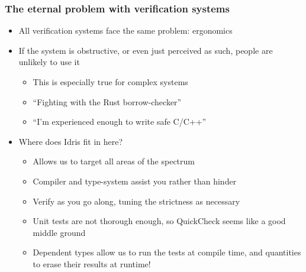 \documentclass[compress,handout]{beamer}
\begin{document}
\begin{frame}
  \frametitle{The eternal problem with verification systems}

  \begin{itemize}
    \item<1-> All verification systems face the same problem: ergonomics
    \item<2-> If the system is obstructive, or even just perceived as such,
              people are unlikely to use it
    \begin{itemize}
      \item<3-> This is especially true for complex systems
      \item<3-> ``Fighting with the Rust borrow-checker''
      \item<3-> ``I'm experienced enough to write safe C/C++''
    \end{itemize}
    \item<4-> Where does Idris fit in here?
      \begin{itemize}
        \item<5-> Allows us to target all areas of the spectrum
        \item<6-> Compiler and type-system assist you rather than hinder
        \item<7-> Verify as you go along, tuning the strictness as necessary
        \item<8-> Unit tests are not thorough enough, so QuickCheck seems like a
                  good middle ground
        \item<9-> Dependent types allow us to run the tests at compile time, and
                  quantities to erase their results at runtime!
      \end{itemize}
  \end{itemize}

  \vspace*{-5mm}

\end{frame}
\end{document}
